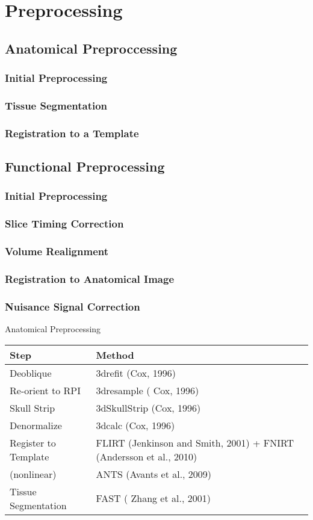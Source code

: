 \section*{Preprocessing}
\subsection{Anatomical Preproccessing}
\subsubsection{Initial Preprocessing}
\subsubsection{Tissue Segmentation}
\subsubsection{Registration to a Template}
\subsection{Functional Preprocessing}
\subsubsection{Initial Preprocessing}
\subsubsection{Slice Timing Correction}
\subsubsection{Volume Realignment}
\subsubsection{Registration to Anatomical Image}
\subsubsection{Nuisance Signal Correction}

Anatomical Preprocessing \\

\begin{tabular}{| l | l |}
	\hline
	Step & Method  \\ \hline
	Deoblique & 3drefit (Cox, 1996)  \\ \hline
	Re-orient to RPI & 3dresample ( Cox, 1996) \\ \hline
	Skull Strip & 3dSkullStrip (Cox, 1996) \\ \hline
	Denormalize & 3dcalc (Cox, 1996) \\ \hline
	Register to Template & FLIRT (Jenkinson and Smith, 2001) + FNIRT (Andersson et al., 2010) \\
	(nonlinear) & ANTS (Avants et al., 2009)  \\ \hline
	Tissue Segmentation & FAST ( Zhang et al., 2001)\\ 
	\hline
\end{tabular}
\\
\\

